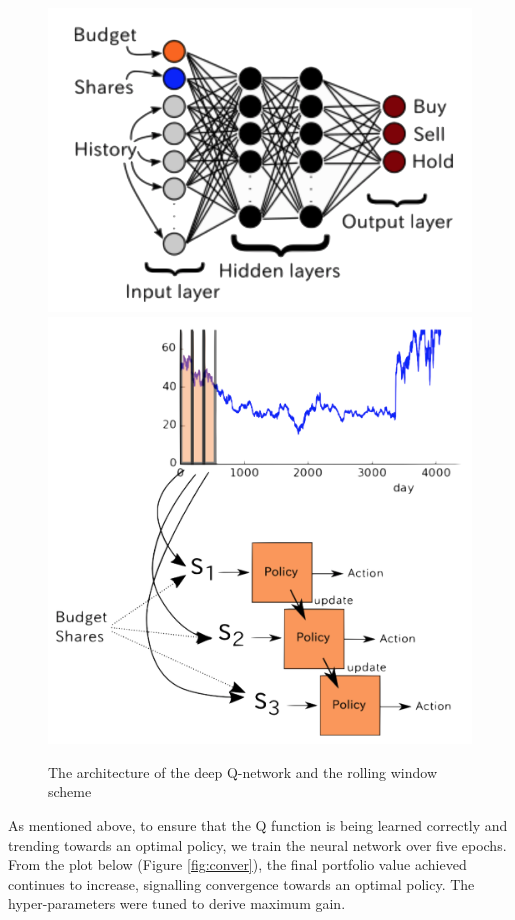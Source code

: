 \documentclass[12pt, authoryear]{elsarticle}
\begin{document}
\begin{figure}[h!]
	\begin{center} 
	\caption{The architecture of the deep Q-network and the rolling window scheme}
	\includegraphics[scale=0.6]{figures/ss_nn.png}
	\includegraphics[scale=0.4]{figures/roling_window.png}
	\label{fig_ss_nn}
	\end{center} 
\end{figure}

As mentioned above, to ensure that the Q function is being learned correctly and trending towards an optimal policy, we train the neural network over five epochs. From the plot below (Figure \ref{fig:conver}), the final portfolio value achieved continues to increase, signalling convergence towards an optimal policy. The hyper-parameters were tuned to derive maximum gain. 
\end{document}
